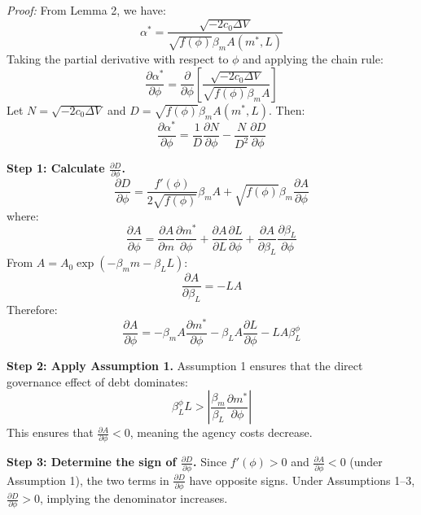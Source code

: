 \documentclass[12pt,a4paper]{article}
\begin{document}
\textit{Proof:}
From Lemma 2, we have:
\begin{equation}
\alpha^* = \frac{\sqrt{-2c_0 \Delta V}}{\sqrt{f(\phi)} \beta_m A(m^*, L)}
\end{equation}
Taking the partial derivative with respect to $\phi$ and applying the chain rule:
\begin{equation}
\frac{\partial \alpha^*}{\partial \phi} = \frac{\partial}{\partial \phi} \left[ \frac{\sqrt{-2c_0 \Delta V}}{\sqrt{f(\phi)} \beta_m A} \right]
\end{equation}
Let $N = \sqrt{-2c_0 \Delta V}$ and $D = \sqrt{f(\phi)} \beta_m A(m^*, L)$. Then:
\begin{equation}
\frac{\partial \alpha^*}{\partial \phi} = \frac{1}{D} \frac{\partial N}{\partial \phi} - \frac{N}{D^2} \frac{\partial D}{\partial \phi}
\end{equation}

\textbf{Step 1: Calculate $\frac{\partial D}{\partial \phi}$.}
\begin{equation}
\frac{\partial D}{\partial \phi} = \frac{f'(\phi)}{2\sqrt{f(\phi)}} \beta_m A + \sqrt{f(\phi)} \beta_m \frac{\partial A}{\partial \phi}
\end{equation}
where:
\begin{equation}
\frac{\partial A}{\partial \phi} = \frac{\partial A}{\partial m} \frac{\partial m^*}{\partial \phi} + \frac{\partial A}{\partial L} \frac{\partial L}{\partial \phi} + \frac{\partial A}{\partial \beta_L} \frac{\partial \beta_L}{\partial \phi}
\end{equation}
From $A = A_0 \exp(-\beta_m m - \beta_L L)$:
\begin{equation}
\frac{\partial A}{\partial \beta_L} = -L A
\end{equation}
Therefore:
\begin{equation}
\frac{\partial A}{\partial \phi} = -\beta_m A \frac{\partial m^*}{\partial \phi} - \beta_L A \frac{\partial L}{\partial \phi} - L A \beta_L^\phi
\end{equation}

\textbf{Step 2: Apply Assumption 1.}
Assumption 1 ensures that the direct governance effect of debt dominates:
\begin{equation}
\beta_L^\phi L > \left| \frac{\beta_m}{\beta_L} \frac{\partial m^*}{\partial \phi} \right|
\end{equation}
This ensures that $\frac{\partial A}{\partial \phi} < 0$, meaning the agency costs decrease.

\textbf{Step 3: Determine the sign of $\frac{\partial D}{\partial \phi}$.}
Since $f'(\phi) > 0$ and $\frac{\partial A}{\partial \phi} < 0$ (under Assumption 1), the two terms in $\frac{\partial D}{\partial \phi}$ have opposite signs. Under Assumptions 1--3, $\frac{\partial D}{\partial \phi} > 0$, implying the denominator increases.
\end{document}
